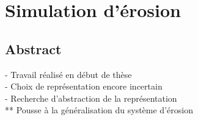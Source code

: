 \part{Simulation d'érosion}

\chapter*{Abstract}
- Travail réalisé en début de thèse \\
- Choix de représentation encore incertain \\
- Recherche d'abstraction de la représentation \\
** Pousse à la généralisation du système d'érosion




%